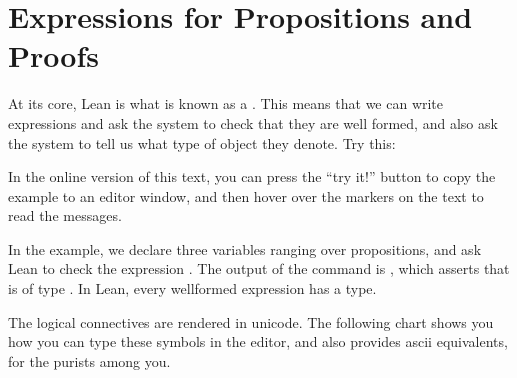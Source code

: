 \documentclass[letterpaper,10pt,english]{sphinxmanual}
\begin{document}
\section{Expressions for Propositions and Proofs}
\label{\detokenize{propositional_logic_in_lean:expressions-for-propositions-and-proofs}}
\sphinxAtStartPar
At its core, Lean is what is known as a . This means that we can write expressions and ask the system to check that they are well formed, and also ask the system to tell us what type of object they denote. Try this:

\begin{sphinxVerbatim}[commandchars=\\\{\}]
     

      
\end{sphinxVerbatim}

\sphinxAtStartPar
In the online version of this text, you can press the “try it!” button to copy the example to an editor window, and then hover over the markers on the text to read the messages.

\sphinxAtStartPar
In the example, we declare three variables ranging over propositions, and ask Lean to check the expression . The output of the  command is , which asserts that  is of type . In Lean, every well\sphinxhyphen{}formed expression has a type.

\sphinxAtStartPar
The logical connectives are rendered in unicode. The following chart shows you how you can type these symbols in the editor, and also provides ascii equivalents, for the purists among you.
\end{document}
